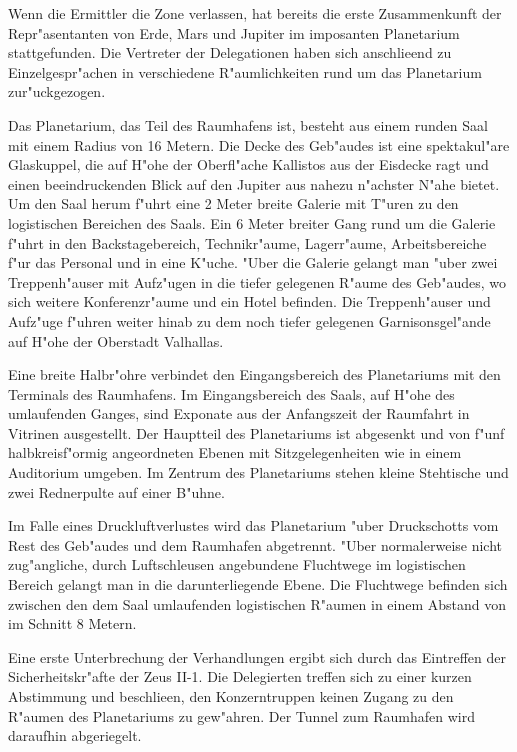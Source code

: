 
Wenn die Ermittler die Zone verlassen, hat bereits die erste Zusammenkunft der Repr"asentanten von Erde, Mars und Jupiter im imposanten Planetarium stattgefunden. Die Vertreter der Delegationen haben sich anschlie\3end zu Einzelgespr"achen in verschiedene R"aumlichkeiten rund um das Planetarium zur"uckgezogen.

Das Planetarium, das Teil des Raumhafens ist, besteht aus einem runden Saal mit einem Radius von 16 Metern. Die Decke des Geb"audes ist eine spektakul"are Glaskuppel, die auf H"ohe der Oberfl"ache Kallistos aus der Eisdecke ragt und einen beeindruckenden Blick auf den Jupiter aus nahezu n"achster N"ahe bietet. Um den Saal herum f"uhrt eine 2 Meter breite Galerie mit T"uren zu den logistischen Bereichen des Saals. Ein 6 Meter breiter Gang rund um die Galerie f"uhrt in den Backstagebereich, Technikr"aume, Lagerr"aume, Arbeitsbereiche f"ur das Personal und in eine K"uche. "Uber die Galerie gelangt man "uber zwei Treppenh"auser mit Aufz"ugen in die tiefer gelegenen R"aume des Geb"audes, wo sich weitere Konferenzr"aume und ein Hotel befinden. Die Treppenh"auser und Aufz"uge f"uhren weiter hinab zu dem noch tiefer gelegenen Garnisonsgel"ande auf H"ohe der Oberstadt Valhallas.

Eine breite Halbr"ohre verbindet den Eingangsbereich des Planetariums mit den Terminals des Raumhafens. Im Eingangsbereich des Saals, auf H"ohe des umlaufenden Ganges, sind Exponate aus der Anfangszeit der Raumfahrt in Vitrinen ausgestellt. Der Hauptteil des Planetariums ist abgesenkt und von f"unf halbkreisf"ormig angeordneten Ebenen mit Sitzgelegenheiten wie in einem Auditorium umgeben. Im Zentrum des Planetariums stehen kleine Stehtische und zwei Rednerpulte auf einer B"uhne.

Im Falle eines Druckluftverlustes wird das Planetarium "uber Druckschotts vom Rest des Geb"audes und dem Raumhafen abgetrennt. "Uber normalerweise nicht zug"angliche, durch Luftschleusen angebundene Fluchtwege im logistischen Bereich gelangt man in die darunterliegende Ebene. Die Fluchtwege befinden sich zwischen den dem Saal umlaufenden logistischen R"aumen in einem Abstand von im Schnitt 8 Metern.


Eine erste Unterbrechung der Verhandlungen ergibt sich durch das Eintreffen der Sicherheitskr"afte der Zeus II-1. Die Delegierten treffen sich zu einer kurzen Abstimmung und beschlie\3en, den Konzerntruppen keinen Zugang zu den R"aumen des Planetariums zu gew"ahren. Der Tunnel zum Raumhafen wird daraufhin abgeriegelt.

